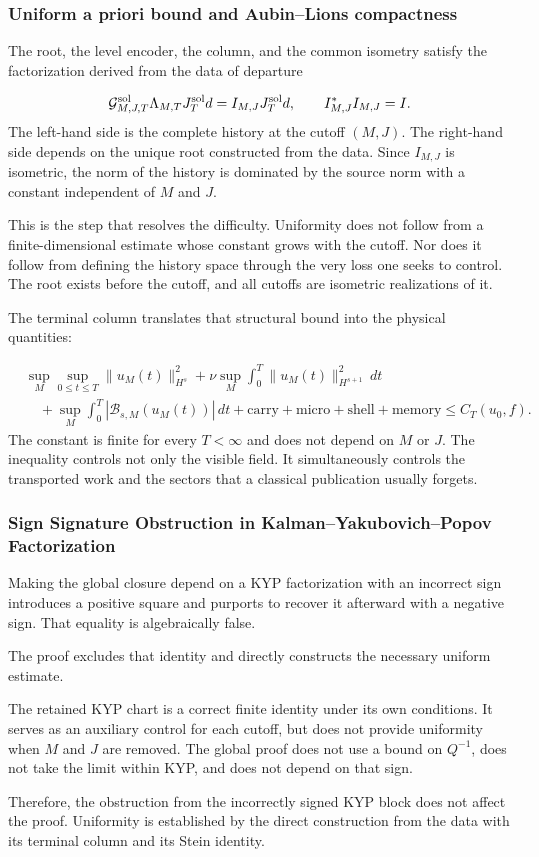 \subsubsection{Uniform a priori bound and Aubin–Lions compactness}
The root, the level encoder, the column, and the common isometry satisfy the factorization derived from the data of departure\par
\[
\mathcal G_{M,J,T}^{\rm sol}
\Lambda_{M,T}
J_T^{\rm sol}d
=
I_{M,J}J_T^{\rm sol}d,
\qquad
I_{M,J}^{*}I_{M,J}=I.
\]
The left-hand side is the complete history at the cutoff \((M,J)\). The right-hand side depends on the unique root constructed from the data. Since \(I_{M,J}\) is isometric, the norm of the history is dominated by the source norm with a constant independent of \(M\) and \(J\).\par
This is the step that resolves the difficulty. Uniformity does not follow from a finite-dimensional estimate whose constant grows with the cutoff. Nor does it follow from defining the history space through the very loss one seeks to control. The root exists before the cutoff, and all cutoffs are isometric realizations of it.\par
The terminal column translates that structural bound into the physical quantities:\par
\[
\begin{aligned}
&\sup_M\sup_{0\le t\le T}\|u_M(t)\|_{H^s}^2
+\nu\sup_M\int_0^T\|u_M(t)\|_{H^{s+1}}^2\,dt\\
&\quad
+\sup_M\int_0^T|\mathscr B_{s,M}(u_M(t))|\,dt
+\text{carry}+\text{micro}+\text{shell}+\text{memory}
\le C_T(u_0,f).
\end{aligned}
\]
The constant is finite for every \(T<\infty\) and does not depend on \(M\) or \(J\). The inequality controls not only the visible field. It simultaneously controls the transported work and the sectors that a classical publication usually forgets.\par
{}
\subsubsection{Sign Signature Obstruction in Kalman–Yakubovich–Popov Factorization}
Making the global closure depend on a KYP factorization with an incorrect sign introduces a positive square and purports to recover it afterward with a negative sign. That equality is algebraically false.\par
The proof excludes that identity and directly constructs the necessary uniform estimate.\par
The retained KYP chart is a correct finite identity under its own conditions. It serves as an auxiliary control for each cutoff, but does not provide uniformity when \(M\) and \(J\) are removed. The global proof does not use a bound on \(Q^{-1}\), does not take the limit within KYP, and does not depend on that sign.\par
Therefore, the obstruction from the incorrectly signed KYP block does not affect the proof. Uniformity is established by the direct construction from the data with its terminal column and its Stein identity.\par
{}
